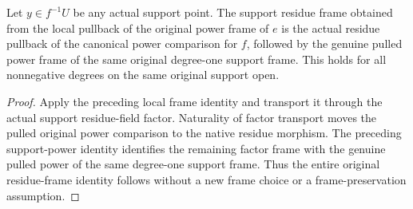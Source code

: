 \begin{theorem}\label{thm:actual-support-local-pullback-power-frame}
\leanok
{}
Let $y\in f^{-1}U$ be any actual support point. The support residue
frame obtained from the local pullback of the original power
frame of $e$ is the actual residue pullback of the canonical power
comparison for $f$, followed by the genuine pulled power frame
of the same original degree-one support frame. This holds for
all nonnegative degrees on the same original support open.
\end{theorem}
\begin{proof}
Apply the preceding local frame identity and transport it through
the actual support residue-field factor. Naturality of factor
transport moves the pulled original power comparison to the
native residue morphism. The preceding support-power identity
identifies the remaining factor frame with the genuine pulled
power of the same degree-one support frame. Thus the entire
original residue-frame identity follows without a new frame
choice or a frame-preservation assumption.
\end{proof}
